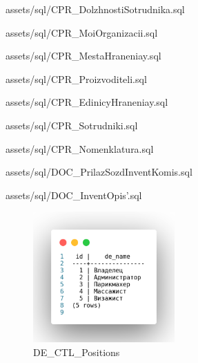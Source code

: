 \lstlistoflistings %
\listoffigures %
\newpage

\thispagestyle{plain}
\pagestyle{plain}
\hspace{0pt}


{assets/sql/CPR_DolzhnostiSotrudnika.sql}


{assets/sql/CPR_MoiOrganizacii.sql}


{assets/sql/CPR_MestaHraneniay.sql}


{assets/sql/CPR_Proizvoditeli.sql}


{assets/sql/CPR_EdinicyHraneniay.sql}


{assets/sql/CPR_Sotrudniki.sql}


{assets/sql/CPR_Nomenklatura.sql}

\newpage


{assets/sql/DOC_PrilazSozdInventKomis.sql}


{assets/sql/DOC_InventOpis'.sql}

\newpage

\begin{figure}[!h]
    \centering

    \includegraphics[height=5cm]
    {assets/sql/DE_CTL_Positions.png}

    \caption{DE\_CTL\_Positions}

    \label{fig:CPR_DolzhnostiSotrudnika}
\end{figure}

